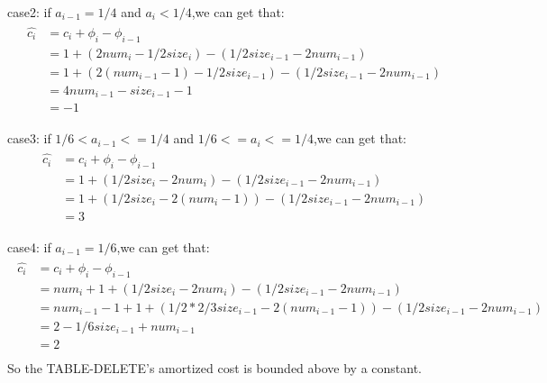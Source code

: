 \documentclass[paper=a4, fontsize=11pt]{scrartcl} %
\numberwithin{equation}{section} %
\numberwithin{figure}{section} %
\numberwithin{table}{section} %
\begin{document}
case2: if $a_{i-1}=1/4$ and $a_i<1/4$,we can get that:
\begin{align*}
\begin{split}
\hat{c_i}&=c_i+\phi_i-\phi_{i-1}\\
         &=1+(2num_i-1/2size_i)-(1/2size_{i-1}-2num_{i-1})\\
         &=1+(2(num_{i-1}-1)-1/2size_{i-1})-(1/2size_{i-1}-2num_{i-1})\\
         &=4num_{i-1}-size_{i-1}-1\\
         &=-1
\end{split}
\end{align*}

case3: if $1/6<a_{i-1}<=1/4$ and $1/6<=a_{i}<=1/4$,we can get that:
\begin{align*}
\begin{split}
\hat{c_i}&=c_i+\phi_i-\phi_{i-1}\\
         &=1+(1/2size_i-2num_i)-(1/2size_{i-1}-2num_{i-1})\\
         &=1+(1/2size_i-2(num_i-1))-(1/2size_{i-1}-2num_{i-1})\\
         &=3
\end{split}
\end{align*}

case4: if $a_{i-1}=1/6$,we can get that:
\begin{align*}
\begin{split}
\hat{c_i}&=c_i+\phi_i-\phi_{i-1}\\
         &=num_i+1+(1/2size_i-2num_i)-(1/2size_{i-1}-2num_{i-1})\\
         &=num_{i-1}-1+1+(1/2*2/3size_{i-1}-2(num_{i-1}-1))-(1/2size_{i-1}-2num_{i-1})\\
         &=2-1/6size_{i-1}+num_{i-1}\\
         &=2\\
\end{split}
\end{align*}
So the TABLE-DELETE's amortized cost is bounded above by a constant.



\vspace{2cm}
\end{document}
